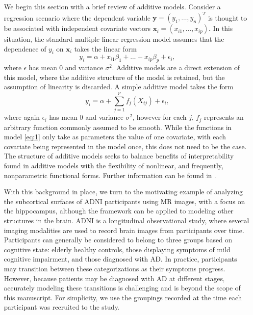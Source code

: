 \documentclass[11pt,reqno]{article}
\theoremstyle{definition}
\begin{document}
We begin this section with a brief review of additive models. Consider a regression scenario where the dependent variable $\mathbf{y} = \left(y_1, \dots, y_n\right)^{T}$ is thought to be associated with independent covariate vectors $\mathbf{x}_i = \left(x_{i1}, \dots, x_{ip}\right)$. In this situation, the standard multiple linear regression model assumes that the dependence of $y_i$ on $\mathbf{x}_i$ takes the linear form
\[%
  y_i = \alpha + x_{i1}\beta_1 + \dots + x_{ip}\beta_p + \epsilon_i
,\]%
where $\epsilon$ has mean 0 and variance $\sigma^2$. Additive models are a direct extension of this model, where the additive structure of the model is retained, but the assumption of linearity is discarded. A simple additive model takes the form
\begin{equation}
  y_i = \alpha + \sum_{j=1}^{p}f_j(X_{ij}) + \epsilon_i, \label{eq:1}
\end{equation}
where again $\epsilon_i$ has mean 0 and variance $\sigma^2$, however for each $j$, $f_j$ represents an arbitrary function commonly assumed to be smooth. While the functions in model \ref{eq:1} only take as parameters the value of one covariate, with each covariate being represented in the model once, this does not need to be the case. The structure of additive models seeks to balance benefits of interpretability found in additive models with the flexibility of nonlinear, and frequently, nonparametric functional forms. Further information can be found in \cite{hastieGeneralizedAdditiveModels1990}.

With this background in place, we turn to the motivating example of analyzing the subcortical surfaces of ADNI participants using MR images, with a focus on the hippocampus, although the framework can be applied to modeling other structures in the brain. ADNI is a longitudinal observational study, where several imaging modalities are used to record brain images from participants over time. Participants can generally be considered to belong to three groups based on cognitive state: elderly healthy controls, those displaying symptoms of mild cognitive impairment, and those diagnosed with AD. In practice, participants may transition between these categorizations as their symptoms progress. However, because patients may be diagnosed with AD at different stages, accurately modeling these transitions is challenging and is beyond the scope of this manuscript. For simplicity, we use the groupings recorded at the time each participant was recruited to the study. 
\end{document}
